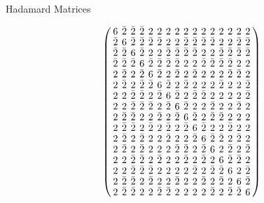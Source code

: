 \documentclass{beamer}
\begin{document}
\begin{frame}{Hadamard Matrices}

  \[
    \arraycolsep=2.0pt\def\arraystretch{0.75}
    \left(
      \begin{array}{cccccccccccccccc}
        6&\bar{2}&\bar{2}&\bar{2}&2&2&2&2&2&2&2&2&2&2&2&2\\
        \bar{2}&6&\bar{2}&\bar{2}&\bar{2}&\bar{2}&2&2&\bar{2}&\bar{2}&\bar{2}&\bar{2}&2&2&\bar{2}&\bar{2}\\
        \bar{2}&\bar{2}&6&\bar{2}&2&2&\bar{2}&\bar{2}&\bar{2}&\bar{2}&2&2&\bar{2}&\bar{2}&\bar{2}&\bar{2}\\
        \bar{2}&\bar{2}&\bar{2}&6&\bar{2}&\bar{2}&\bar{2}&\bar{2}&2&2&\bar{2}&\bar{2}&\bar{2}&\bar{2}&2&2\\
        2&\bar{2}&2&\bar{2}&6&\bar{2}&2&\bar{2}&2&\bar{2}&2&2&2&\bar{2}&\bar{2}&2\\
        2&\bar{2}&2&\bar{2}&\bar{2}&6&\bar{2}&2&\bar{2}&2&2&2&\bar{2}&2&2&\bar{2}\\
        2&2&\bar{2}&\bar{2}&2&\bar{2}&6&\bar{2}&2&\bar{2}&\bar{2}&2&2&2&2&\bar{2}\\
        2&2&\bar{2}&\bar{2}&\bar{2}&2&\bar{2}&6&\bar{2}&2&2&\bar{2}&2&2&\bar{2}&2\\
        2&\bar{2}&\bar{2}&2&2&\bar{2}&2&\bar{2}&6&\bar{2}&2&\bar{2}&\bar{2}&2&2&2\\
        2&\bar{2}&\bar{2}&2&\bar{2}&2&\bar{2}&2&\bar{2}&6&\bar{2}&2&2&\bar{2}&2&2\\
        2&\bar{2}&2&\bar{2}&2&2&\bar{2}&2&2&\bar{2}&6&\bar{2}&\bar{2}&2&\bar{2}&2\\
        2&\bar{2}&2&\bar{2}&2&2&2&\bar{2}&\bar{2}&2&\bar{2}&6&2&\bar{2}&2&\bar{2}\\
        2&2&\bar{2}&\bar{2}&2&\bar{2}&2&2&\bar{2}&2&\bar{2}&2&6&\bar{2}&\bar{2}&2\\
        2&2&\bar{2}&\bar{2}&\bar{2}&2&2&2&2&\bar{2}&2&\bar{2}&\bar{2}&6&2&\bar{2}\\
        2&\bar{2}&\bar{2}&2&\bar{2}&2&2&\bar{2}&2&2&\bar{2}&2&\bar{2}&2&6&\bar{2}\\
        2&\bar{2}&\bar{2}&2&2&\bar{2}&\bar{2}&2&2&2&2&\bar{2}&2&\bar{2}&\bar{2}&6\\
      \end{array}
    \right)
  \]
 
\end{frame}
\end{document}
